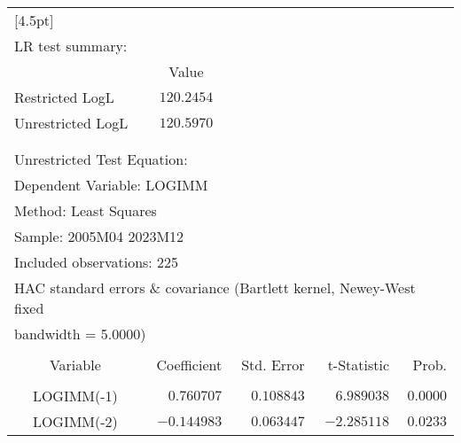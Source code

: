 \begin{tabular}{lrrrr}
[4.5pt] \hline \\ [-4.5pt]
\multicolumn{1}{l}{LR test summary:}&\multicolumn{1}{c}{}&\multicolumn{1}{c}{}&\multicolumn{1}{c}{}&\multicolumn{1}{c}{}\\
\multicolumn{1}{c}{}&\multicolumn{1}{c}{Value}&\multicolumn{1}{c}{}&\multicolumn{1}{c}{}&\multicolumn{1}{c}{}\\
\multicolumn{1}{l}{Restricted LogL}&\multicolumn{1}{c}{$120.2454$}&\multicolumn{1}{c}{}&\multicolumn{1}{c}{}&\multicolumn{1}{c}{}\\
\multicolumn{1}{l}{Unrestricted LogL}&\multicolumn{1}{c}{$120.5970$}&\multicolumn{1}{c}{}&\multicolumn{1}{c}{}&\multicolumn{1}{c}{}\\
[4.5pt] \hline \\ [-4.5pt]
\multicolumn{1}{c}{}&\multicolumn{1}{c}{}&\multicolumn{1}{c}{}&\multicolumn{1}{c}{}&\multicolumn{1}{c}{}\\
\multicolumn{2}{l}{Unrestricted Test Equation:}&\multicolumn{1}{c}{}&\multicolumn{1}{c}{}&\multicolumn{1}{c}{}\\
\multicolumn{2}{l}{Dependent Variable: LOGIMM}&\multicolumn{1}{c}{}&\multicolumn{1}{c}{}&\multicolumn{1}{c}{}\\
\multicolumn{2}{l}{Method: Least Squares}&\multicolumn{1}{c}{}&\multicolumn{1}{c}{}&\multicolumn{1}{c}{}\\
\multicolumn{2}{l}{Sample: 2005M04 2023M12}&\multicolumn{1}{c}{}&\multicolumn{1}{c}{}&\multicolumn{1}{c}{}\\
\multicolumn{2}{l}{Included observations: 225}&\multicolumn{1}{c}{}&\multicolumn{1}{c}{}&\multicolumn{1}{c}{}\\
\multicolumn{6}{l}{HAC standard errors \& covariance (Bartlett kernel, Newey-West fixed}\\
\multicolumn{2}{l}{bandwidth = 5.0000)}&\multicolumn{1}{c}{}&\multicolumn{1}{c}{}&\multicolumn{1}{c}{}\\
[4.5pt] \hline \\ [-4.5pt]
\multicolumn{1}{c}{Variable}&\multicolumn{1}{r}{Coefficient}&\multicolumn{1}{r}{Std. Error}&\multicolumn{1}{r}{t-Statistic}&\multicolumn{1}{r}{Prob.}\\
[4.5pt] \hline \\ [-4.5pt]
\multicolumn{1}{c}{LOGIMM(-1)}&\multicolumn{1}{r}{$0.760707$}&\multicolumn{1}{r}{$0.108843$}&\multicolumn{1}{r}{$6.989038$}&\multicolumn{1}{r}{$0.0000$}\\
\multicolumn{1}{c}{LOGIMM(-2)}&\multicolumn{1}{r}{$-0.144983$}&\multicolumn{1}{r}{$0.063447$}&\multicolumn{1}{r}{$-2.285118$}&\multicolumn{1}{r}{$0.0233$}\\

\end{tabular}
